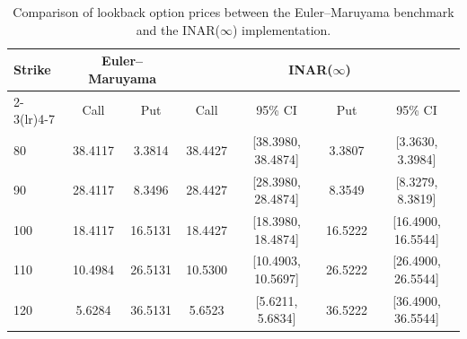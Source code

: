 \documentclass[letterpaper]{article}
\numberwithin{equation}{section}
\theoremstyle{definition}
\theoremstyle{remark}
\begin{document}
\begin{table}[ht]
  \centering
  \caption{Comparison of lookback option prices between the Euler--Maruyama benchmark and the INAR($\infty$) implementation.}
  \small
  \setlength{\tabcolsep}{5pt}
  \begin{tabular*}{\textwidth}{@{\extracolsep{\fill}}lcccccc@{}}
  \toprule
  \multirow{2}{*}{Strike} & \multicolumn{2}{c}{Euler--Maruyama} & \multicolumn{4}{c}{INAR($\infty$)} \\
  \cmidrule(lr){2-3}\cmidrule(lr){4-7}
   & Call & Put & Call & 95\% CI & Put & 95\% CI \\
  \midrule
  80  & 38.4117 & 3.3814 & 38.4427 & [38.3980, 38.4874] & 3.3807 & [3.3630, 3.3984] \\
  90  & 28.4117 & 8.3496 & 28.4427 & [28.3980, 28.4874] & 8.3549 & [8.3279, 8.3819] \\
  100 & 18.4117 & 16.5131 & 18.4427 & [18.3980, 18.4874] & 16.5222 & [16.4900, 16.5544] \\
  110 & 10.4984 & 26.5131 & 10.5300 & [10.4903, 10.5697] & 26.5222 & [26.4900, 26.5544] \\
  120 & 5.6284  & 36.5131 & 5.6523  & [5.6211, 5.6834]  & 36.5222 & [36.4900, 36.5544] \\
  \bottomrule
  \end{tabular*}
  \label{tab:lookback_comparison}
\end{table}
\end{document}
